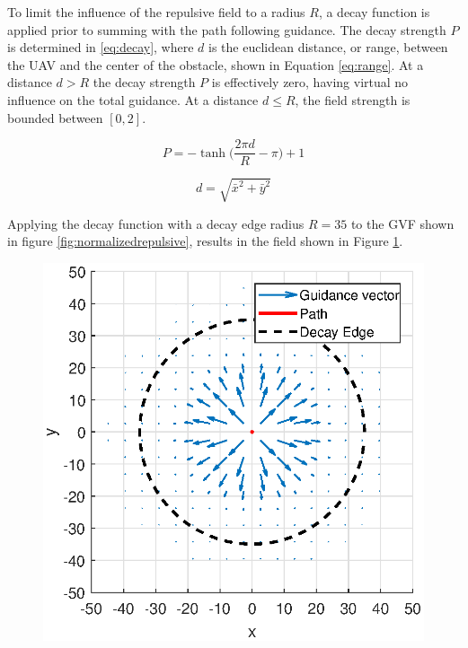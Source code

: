 \documentclass[conf]{new-aiaa}
\begin{document}
To limit the influence of the repulsive field to a radius $R$, a decay function is applied prior to summing with the path following guidance. The decay strength $P$ is determined in \ref{eq:decay}, where $d$ is the euclidean distance, or range, between the UAV and the center of the obstacle, shown in Equation \ref{eq:range}. At a distance $d>R$ the decay strength $P$ is effectively zero, having virtual no influence on the total guidance. At a distance $d\leq R$, the field strength is bounded between $[0,2]$.


\begin{equation}
\label{eq:decay}
P = -\tanh \bigg( \frac{2\pi d}{R}-\pi\bigg)+1
\end{equation}

\begin{equation}
\label{eq:range}
d = \sqrt{ \bar{x}^2+\bar{y}^2}
\end{equation}

Applying the decay function with a decay edge radius $R = 35$ to the GVF shown in figure \ref{fig:normalizedrepulsive}, results in the field shown in Figure \ref{fig:decayapplied}.





\begin{figure}[H]
	\centering
	\includegraphics[width=0.7\linewidth]{Figures/methods/decayApplied}
	\caption{}
	\label{fig:decayapplied}
\end{figure}
\end{document}
